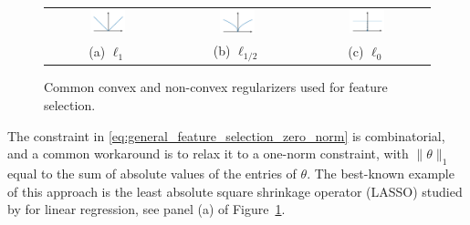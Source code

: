  \begin{figure}[h!]
    \centering
    \begin{tabular}{ccc}
        \includegraphics[width=0.3\textwidth]{figures/l1_regularizer.pdf}
&
           \includegraphics[width=0.3\textwidth]{figures/lh_regularizer.pdf}
    &
    \includegraphics[width=0.3\textwidth]{figures/l0_regularizer.pdf}\\
              (a) $\ell_1$  & (b) $\ell_{1/2}$ & (c) $\ell_0$
    \end{tabular}
    \caption{Common convex and non-convex regularizers used for feature selection.}
    \label{fig:regularizers}
\end{figure}


The constraint in \eqref{eq:general_feature_selection_zero_norm} is 
combinatorial, and a common workaround is to relax it to a one-norm constraint, 
with $\|\theta\|_1$ equal to the sum of absolute values of the entries of $\theta$. 
The best-known example of this approach is the least absolute square shrinkage operator (LASSO) studied by \cite{Tibshirani1996} for linear regression, 
see panel (a) of Figure~\ref{fig:regularizers}.
 
  
